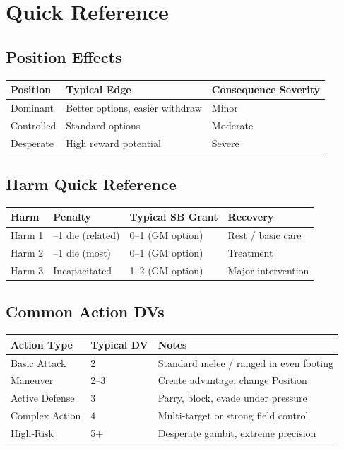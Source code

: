 \section{Quick Reference}\label{sec:combat_quick_ref}

\subsection{Position Effects}\label{subsec:position_quick_ref}
\begin{longtable}{lll}
\toprule
\textbf{Position} & \textbf{Typical Edge} & \textbf{Consequence Severity} \\
\midrule
Dominant   & Better options, easier withdraw & Minor \\
Controlled & Standard options               & Moderate \\
Desperate  & High reward potential          & Severe \\
\bottomrule
\end{longtable}

\subsection{Harm Quick Reference}\label{subsec:harm_quick_ref}
\begin{longtable}{llll}
\toprule
\textbf{Harm} & \textbf{Penalty} & \textbf{Typical SB Grant} & \textbf{Recovery} \\
\midrule
Harm 1 & --1 die (related)      & 0--1 (GM option) & Rest / basic care \\
Harm 2 & --1 die (most)         & 0--1 (GM option) & Treatment \\
Harm 3 & Incapacitated         & 1--2 (GM option) & Major intervention \\
\bottomrule
\end{longtable}

\subsection{Common Action DVs}\label{subsec:action_dvs}
\begin{longtable}{lll}
\toprule
\textbf{Action Type} & \textbf{Typical DV} & \textbf{Notes} \\
\midrule
Basic Attack    & 2 & Standard melee / ranged in even footing \\
Maneuver        & 2--3 & Create advantage, change Position \\
Active Defense  & 3 & Parry, block, evade under pressure \\
Complex Action  & 4 & Multi‑target or strong field control \\
High‑Risk       & 5+ & Desperate gambit, extreme precision \\
\bottomrule
\end{longtable}

